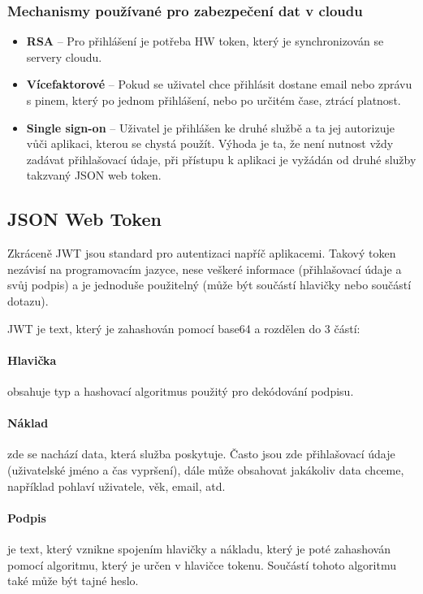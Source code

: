 \subsubsection{Mechanismy používané pro zabezpečení dat v cloudu}
\begin{itemize}
  \item \textbf{RSA} -- Pro přihlášení je potřeba HW token, který je synchronizován se servery cloudu.
  \item \textbf{Vícefaktorové} -- Pokud se uživatel chce přihlásit dostane email nebo zprávu s pinem, který po jednom přihlášení, nebo po určitém čase, ztrácí platnost.
  \item \textbf{Single sign-on} -- Uživatel je přihlášen ke druhé službě a ta jej autorizuje vůči aplikaci, kterou se chystá použít. Výhoda je ta, že není nutnost vždy zadávat přihlašovací údaje, při přístupu k aplikaci je vyžádán od druhé služby takzvaný JSON web token. \cite{cloud-security}
\end{itemize}

\subsection{JSON Web Token}
\par Zkráceně JWT jsou standard pro autentizaci napříč aplikacemi. Takový token nezávisí na programovacím jazyce, nese veškeré informace (přihlašovací údaje a svůj podpis) a je jednoduše použitelný (může být součástí hlavičky nebo součástí dotazu).  \cite{scotch-jwt}

\par JWT je text, který je zahashován pomocí base64 a rozdělen do 3 částí:

\paragraph{Hlavička} obsahuje typ a hashovací algoritmus použitý pro dekódování podpisu.

\paragraph{Náklad} zde se nachází data, která služba poskytuje. Často jsou zde přihlašovací údaje (uživatelské jméno a čas vypršení), dále může obsahovat jakákoliv data chceme, například pohlaví uživatele, věk, email, atd.

\paragraph{Podpis} je text, který vznikne spojením hlavičky a nákladu, který je poté zahashován pomocí algoritmu, který je určen v hlavičce tokenu. Součástí tohoto algoritmu také může být tajné heslo. \cite{rfc-jwt}

